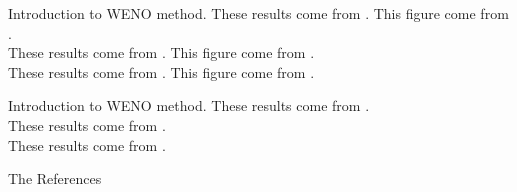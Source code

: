 \documentclass[11pt]{beamer}
\begin{document}
\begin{frame}{Introduction to WENO method.}
    These results come from \cite{BalsaraShu2000}.
    This figure come from \footnotemark[1].\\
    These results come from \cite{JiangShu1996}.
    This figure come from \footnotemark[2].\\
    These results come from \cite{DucrosEtal2000}.
    This figure come from \footnotemark[3].
\end{frame}

\begin{frame}{Introduction to WENO\cite{JiangShu1996} method.}
    These results come from \cite{BalsaraShu2000}.\\
    These results come from \cite{JiangShu1996}.\\
    These results come from \cite{DucrosEtal2000}.
\end{frame}

\begin{frame}{The References}
    \printbibliography
\end{frame}
\end{document}
